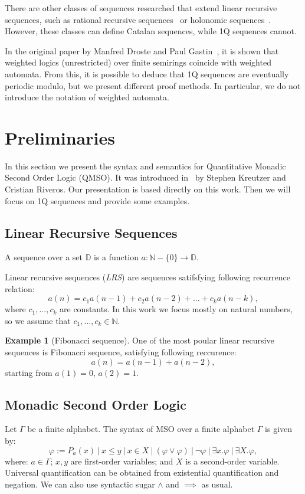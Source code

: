 \documentclass[12pt]{article}
\theoremstyle{definition}
\newtheorem{example}{Example}[section]
\begin{document}
There are other classes of sequences researched that extend linear recursive sequences, such as rational recursive sequences~\cite{ClementeDMP23} or holonomic sequences~\cite{KenisonKLLMOW021}. However, these classes can define Catalan sequences, while 1Q sequences cannot.

In the original paper by Manfred Droste and Paul Gastin~\cite{DrosteG07}, it is shown that weighted logics (unrestricted) over finite semirings coincide with weighted automata. From this, it is possible to deduce that 1Q sequences are eventually periodic modulo, but we present different proof methods. In particular, we do not introduce the notation of weighted automata.

\section{Preliminaries}
In this section we present the syntax and semantics for Quantitative Monadic Second Order Logic (QMSO). It was introduced in~\cite{KreutzerR13} by Stephen Kreutzer and Cristian Riveros. Our presentation is based directly on this work. Then we will focus on 1Q sequences and provide some examples.

\subsection{Linear Recursive Sequences}
A sequence over a set $\mathbb{D}$ is a function $a : \mathbb{N} - \{0\} \rightarrow \mathbb{D}$.

Linear recursive sequences (\emph{LRS}) are sequences satifsfying following recurrence relation:
$$a(n) = c_1 a(n-1) + c_2 a(n-2) + \ldots + c_k a(n-k),$$
where $c_1,\ldots,c_k$ are constants. In this work we focus mostly on natural numbers, so we assume that $c_1,\ldots ,c_k \in \mathbb{N}$.

\begin{example}[Fibonacci sequence]
    One of the most poular linear recursive sequences is Fibonacci sequence, satisfying following reccurence:
    $$a(n) = a(n-1) + a(n-2),$$
    starting from $a(1) = 0$, $a(2) = 1$.
\end{example}

\subsection{Monadic Second Order Logic}

Let $\Gamma$ be a finite alphabet. The syntax of MSO over a finite alphabet $\Gamma$ is given by:
$$ \varphi := P_a(x) \ | \ x \leq y \ | \ x \in X \ | \ (\varphi \lor \varphi) \ | \ \neg \varphi \ | \ \exists x. \varphi \ | \ \exists X . \varphi, $$
where: $a \in \Gamma$; $x, y$ are first-order variables; and $X$ is a second-order variable. Universal quantification can be obtained from existential quantification and negation. We can also use syntactic sugar $\land$ and $\implies$ as usual.
\end{document}
